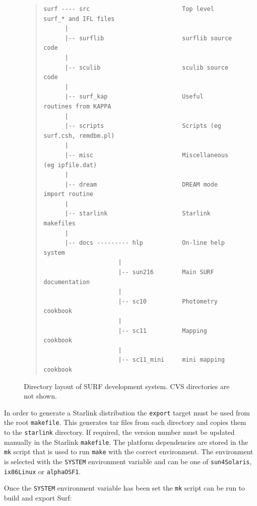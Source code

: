 \documentclass[twoside,11pt]{article}
\newenvironment{myquote}{\begin{quote}\begin{small}}{\end{small}\end{quote}}
\newcommand{\scusoft}          {{\sc Surf}}
\renewcommand{\_}{\texttt{\symbol{95}}}
\begin{document}
\begin{figure}
\begin{center}
\begin{myquote}
\begin{verbatim}
surf ---- src                          Top level surf_* and IFL files
      |
      |-- surflib                      surflib source code
      |
      |-- sculib                       sculib source code
      |
      |-- surf_kap                     Useful routines from KAPPA
      |
      |-- scripts                      Scripts (eg surf.csh, remdbm.pl)
      |
      |-- misc                         Miscellaneous (eg ipfile.dat)
      |
      |-- dream                        DREAM mode import routine
      |
      |-- starlink                     Starlink makefiles
      |
      |-- docs --------- hlp           On-line help system
                     |
                     |-- sun216        Main SURF documentation
                     |
                     |-- sc10          Photometry cookbook
                     |
                     |-- sc11          Mapping cookbook
                     |
                     |-- sc11_mini     mini mapping cookbook
\end{verbatim}
\end{myquote}
\end{center}
\caption{Directory layout of SURF development system. CVS directories are not
shown.}
\label{surf:devel}
\end{figure}

In order to generate a Starlink distribution the \texttt{export} target must
be used from the root \texttt{makefile}. This generates tar files from each
directory and copies them to the \texttt{starlink} directory.  If required, the
version number must be updated manually in the Starlink \texttt{makefile}.
The platform dependencies are stored in the \texttt{mk} script that is used
to run \texttt{make} with the correct environment. The environment is selected
with the \texttt{SYSTEM} environment variable and can be one of
\texttt{sun4\_Solaris}, \texttt{ix86\_Linux} or \texttt{alpha\_OSF1}.

Once the \texttt{SYSTEM} environment variable has been set the \texttt{mk}
script can be run to build and export \scusoft:
\end{document}
